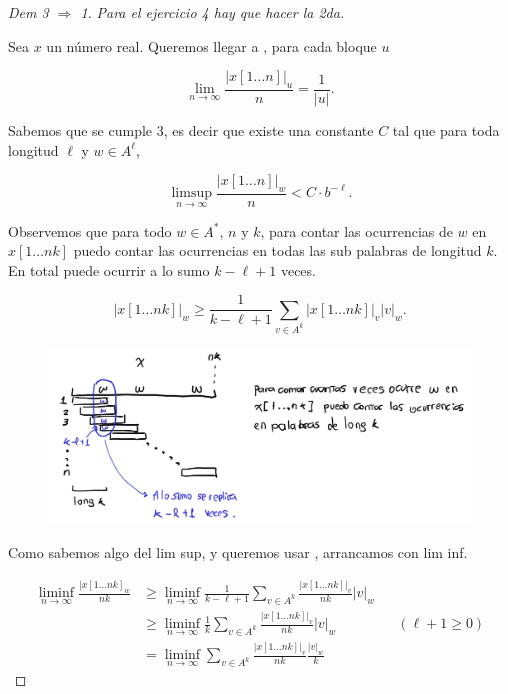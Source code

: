\documentclass{report}
\theoremstyle{definition} %
\begin{document}
\begin{proof}[Dem 3 $\Rightarrow$ 1]
    \textit{Para el ejercicio 4 hay que hacer la 2da.}

    Sea $x$ un número real. Queremos llegar a , para cada bloque $u$

    $$\lim_{n\to \infty} \frac{|x[1\dots n]|_u}{n} = \frac{1}{|u|}.$$

    Sabemos que se cumple 3, es decir que existe una constante $C$ tal que para
    toda longitud $\ell$ y $w \in A^\ell$,

    $$
    \limsup_{n\to\infty}
    \frac{|x[1\dots n]|_w}{n} < C \cdot b^{-\ell}.
    $$

    Observemos que para todo $w \in A^*$, $n$ y $k$, para contar las ocurrencias
    de $w$ en $x[1\dots nk]$ puedo contar las ocurrencias en todas las sub
    palabras de longitud $k$. En total puede ocurrir a lo sumo $k - \ell + 1$ veces.

    \[
        |x[1\dots nk]|_w
            \geq \frac{1}{k - \ell + 1} \sum_{v \in A^k} |x[1\dots nk]|_v |v|_w.
    \]

    \begin{figure}[H]
        \centering
        \includegraphics[scale=0.3]{img/3_pts.png}
    \end{figure}

    Como sabemos algo del lim sup, y queremos usar ,
    arrancamos con lim inf.

    \begin{align*}
        \liminf_{n\to \infty} \frac{|x[1\dots nk]_w}{nk}
            &\geq
                \liminf_{n\to \infty}
                \frac{1}{k - \ell + 1} 
                    \sum_{v \in A^k} \frac{|x[1\dots nk]|_v}{nk} |v|_w \\
            &\geq
                \liminf_{n\to \infty}
                \frac{1}{k} 
                    \sum_{v \in A^k} \frac{|x[1\dots nk]|_v}{nk} |v|_w 
            &&(\ell + 1 \geq 0)\\
            &= \liminf_{n\to \infty}
                \sum_{v \in A^k} \frac{|x[1\dots nk]|_v}{nk} \frac{|v|_w}{k}
    \end{align*}


\end{proof}
\end{document}
